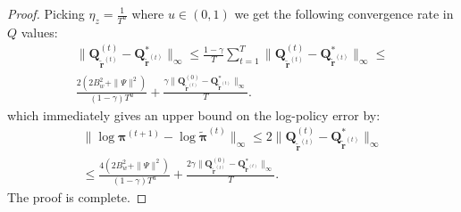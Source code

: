 \begin{proof}
Picking $\eta_z= \frac{1}{T^u}$ where $u\in (0,1)$ we get the following convergence rate in $Q$ values:
\begin{align*}
    \|\bm{Q}^{(t)}_{\tilde{\bm{r}}^{(t)}}
    - \bm{Q}^*_{\tilde{\bm{r}}^{(t)}} \|_\infty 
    \leq 
    \frac{1-\gamma}{T} \sum^{T}_{t=1}   
    \|\bm{Q}^{(t)}_{\tilde{\bm{r}}^{(t)}}
    - \bm{Q}^*_{\tilde{\bm{r}}^{(t)}} \|_\infty
    \leq\\
    \frac{2(2 B_w^2+\|\Psi\|^2)}{(1 - \gamma)T^u}
    +
    \frac{\gamma 
    \|\bm{Q}^{(0)}_{\tilde{\bm{r}}^{(t)}}
    - \bm{Q}^*_{\tilde{\bm{r}}^{(t)}} \|_\infty
    }{T}.
 \end{align*}
which immediately gives an upper bound on the log-policy error by:
\begin{align*}
    \| \log \bm{\pi}^{(t+1)} - \log \tilde{\bm{\pi}}^{(t)} \|_\infty 
    \leq 2
    \|\bm{Q}^{(t)}_{\tilde{\bm{r}}^{(t)}}
    - \bm{Q}^*_{\tilde{\bm{r}}^{(t)}} \|_\infty \\
    \leq
    \frac{4(2 B_w^2+\|\Psi\|^2)}{(1 - \gamma)T^u} +
    \frac{2 \gamma 
    \|\bm{Q}^{(0)}_{\tilde{\bm{r}}^{(t)}}
    - \bm{Q}^*_{\tilde{\bm{r}}^{(t)}} \|_\infty
    }{T}.
 \end{align*}
 The proof is complete.
 
\end{proof}

